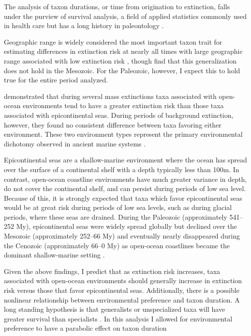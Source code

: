 \documentclass{article}
\begin{document}
The analysis of taxon durations, or time from origination to extinction, falls under the purview of survival analysis, a field of applied statistics commonly used in health care \citep{Klein2003} but has a long history in paleontology \citep{Simpson1944,Simpson1953,VanValen1973,VanValen1979}.

Geographic range is widely considered the most important taxon trait for estimating differences in extinction risk at nearly all times with large geographic range associated with low extinction risk \citep{Jablonski1986,Jablonski1987,Jablonski2003,Payne2007}, though \citet{Foote2013} find that this generalization does not hold in the Mesozoic. For the Paleozoic, however, I expect this to hold true for the entire period analyzed.

\citet{Miller2009a} demonstrated that during several mass extinctions taxa associated with open-ocean environments tend to have a greater extinction risk than those taxa associated with epicontinental seas. During periods of background extinction, however, they found no consistent difference between taxa favoring either environment. These two environment types represent the primary environmental dichotomy observed in ancient marine systems \citep{Miller2009a,Peters2008,Sheehan2001b}. 

Epicontinental seas are a shallow-marine environment where the ocean has spread over the surface of a continental shelf with a depth typically less than 100m. In contrast, open-ocean coastline environments have much greater variance in depth, do not cover the continental shelf, and can persist during periods of low sea level. Because of this, it is strongly expected that taxa which favor epicontinental seas would be at great risk during periods of low sea levels, such as during glacial periods, where these seas are drained. During the Paleozoic (approximately 541--252 My), epicontinental seas were widely spread globally but declined over the Mesozoic (approximately 252--66 My) and eventually nearly disappeared during the Cenozoic (approximately 66--0 My) as open-ocean coastlines became the dominant shallow-marine setting \citep{Peters2008,Miller2009a,Johnson1974}. 

Given the above findings, I predict that as extinction risk increases, taxa associated with open-ocean environments should generally increase in extinction risk versus those that favor epicontinental seas. Additionally, there is a possible nonlinear relationship between environmental preference and taxon duration. A long standing hypothesis is that generalists or unspecialized taxa will have greater survival than specialists \citep{Simpson1944,Liow2004a,Liow2007b,Nurnberg2013a,Nurnberg2015,Baumiller1993}. In this analysis I allowed for environmental preference to have a parabolic effect on taxon duration 
\end{document}
